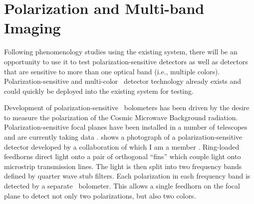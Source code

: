 \section{Polarization and Multi-band Imaging}

Following phenomenology studies using the existing system, there will be an opportunity to use it to test polarization-sensitive detectors as well as detectors that are sensitive to more than one optical band (i.e., multiple colors).
Polarization-sensitive and multi-color \TES\ detector technology already exists and could quickly be deployed into the existing system for testing.

Development of polarization-sensitive \TES\ bolometers has been driven by the desire to measure the polarization of the Cosmic Microwave Background radiation.
Polarization-sensitive focal planes have been installed in a number of telescopes and are currently taking data \cite{obrient_antenna-coupled_2012,austermann_sptpol:_2012,keating_ultra_2011,niemack_actpol:_2010,kusaka_modulation_2013}.
 shows a photograph of a polarization-sensitive detector developed by a collaboration of which I am a member \cite{datta_horn_2014}.
Ring-loaded feedhorns direct light onto a pair of orthogonal ``fins'' which couple light onto microstrip transmission lines.
The light is then split into two frequency bands defined by quarter wave stub filters.
Each polarization in each frequency band is detected by a separate \TES\ bolometer. 
This allows a single feedhorn on the focal plane to detect not only two polarizations, but also two colors.

